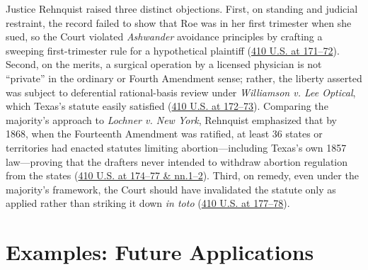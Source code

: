 \documentclass[12pt]{article}
\begin{document}
Justice Rehnquist raised three distinct objections. First, on standing and judicial restraint, the record failed to show that Roe was in her first trimester when she sued, so the Court violated \textit{Ashwander} avoidance principles by crafting a sweeping first-trimester rule for a hypothetical plaintiff (\href{https://supreme.justia.com/cases/federal/us/410/113/}{410 U.S. at 171--72}). Second, on the merits, a surgical operation by a licensed physician is not ``private'' in the ordinary or Fourth Amendment sense; rather, the liberty asserted was subject to deferential rational-basis review under \textit{Williamson v. Lee Optical}, which Texas's statute easily satisfied (\href{https://supreme.justia.com/cases/federal/us/410/113/}{410 U.S. at 172--73}). Comparing the majority's approach to \textit{Lochner v. New York}, Rehnquist emphasized that by 1868, when the Fourteenth Amendment was ratified, at least 36 states or territories had enacted statutes limiting abortion---including Texas's own 1857 law---proving that the drafters never intended to withdraw abortion regulation from the states (\href{https://supreme.justia.com/cases/federal/us/410/113/}{410 U.S. at 174--77 \& nn.1--2}). Third, on remedy, even under the majority's framework, the Court should have invalidated the statute only as applied rather than striking it down \textit{in toto} (\href{https://supreme.justia.com/cases/federal/us/410/113/}{410 U.S. at 177--78}).

\section{Examples: Future Applications}
\end{document}
